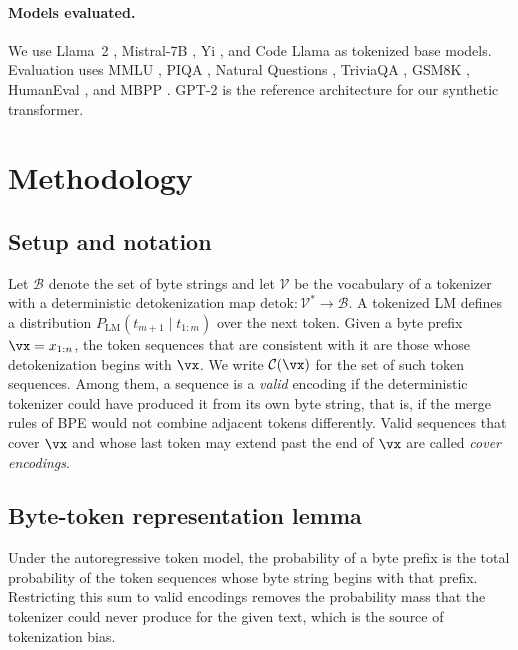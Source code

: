 \documentclass{article} %
\begin{document}
\paragraph{Models evaluated.} We use Llama~2 \citep{touvron2023llama2}, Mistral-7B \citep{jiang2023mistral}, Yi \citep{young2024yi}, and Code Llama \citep{roziere2023codellama} as tokenized base models. Evaluation uses MMLU \citep{hendrycks2021mmlu}, PIQA \citep{bisk2020piqa}, Natural Questions \citep{kwiatkowski2019nq}, TriviaQA \citep{joshi2017triviaqa}, GSM8K \citep{cobbe2021gsm8k}, HumanEval \citep{chen2021humaneval}, and MBPP \citep{austin2021mbpp}. GPT-2 \citep{radford2019gpt2} is the reference architecture for our synthetic transformer.

\section{Methodology}
\label{sec:method}
\subsection{Setup and notation}
Let $\mathcal{B}$ denote the set of byte strings and let $\mathcal{V}$ be the vocabulary of a tokenizer with a deterministic detokenization map $\mathrm{detok}: \mathcal{V}^* \to \mathcal{B}$. A tokenized LM defines a distribution $P_{\mathrm{LM}}(t_{m+1} \mid t_{1:m})$ over the next token. Given a byte prefix $\vx = x_{1:n}$, the token sequences that are consistent with it are those whose detokenization begins with $\vx$. We write $\mathcal{C}(\vx)$ for the set of such token sequences. Among them, a sequence is a \emph{valid} encoding if the deterministic tokenizer could have produced it from its own byte string, that is, if the merge rules of BPE would not combine adjacent tokens differently. Valid sequences that cover $\vx$ and whose last token may extend past the end of $\vx$ are called \emph{cover encodings}.

\subsection{Byte-token representation lemma}
Under the autoregressive token model, the probability of a byte prefix is the total probability of the token sequences whose byte string begins with that prefix. Restricting this sum to valid encodings removes the probability mass that the tokenizer could never produce for the given text, which is the source of tokenization bias.
\end{document}
